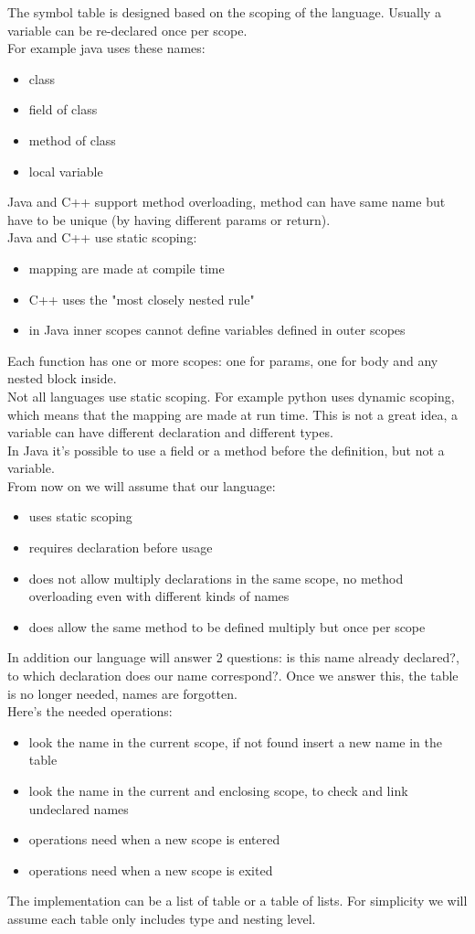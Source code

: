 \documentclass[12pt]{article}
\begin{document}
The symbol table is designed based on the scoping of the language. Usually a variable can be re-declared once per scope.
\\ For example java uses these names: 
\begin{itemize}
    \item class 
    \item field of class 
    \item method of class
    \item local variable
\end{itemize}
Java and C++ support method overloading, method can have same name but have to be unique (by having different params or return). 
\\ Java and C++ use static scoping:
\begin{itemize}
    \item mapping are made at compile time 
    \item C++ uses the "most closely nested rule"
    \item in Java inner scopes cannot define variables defined in outer scopes
\end{itemize}
Each function has one or more scopes: one for params, one for body and any nested block inside.
\\ Not all languages use static scoping. For example python uses dynamic scoping, which means that the mapping are made at run time. This is not a great idea, a variable can have different declaration and different types.
\\ In Java it's possible to use a field or a method before the definition, but not a variable.
\\ From now on we will assume that our language: 
\begin{itemize}
    \item uses static scoping
    \item requires declaration before usage 
    \item does not allow multiply declarations in the same scope, no method overloading even with different kinds of names 
    \item does allow the same method to be defined multiply but once per scope
\end{itemize}
In addition our language will answer 2 questions: is this name already declared?, to which declaration does our name correspond?. Once we answer this, the table is no longer needed, names are forgotten.
\\ Here's the needed operations: 
\begin{itemize}
    \item look the name in the current scope, if not found insert a new name in the table
    \item look the name in the current and enclosing scope, to check and link undeclared names
    \item operations need when a new scope is entered
    \item operations need when a new scope is exited
\end{itemize}
The implementation can be a list of table or a table of lists. For simplicity we will assume each table only includes type and nesting level.
\end{document}
